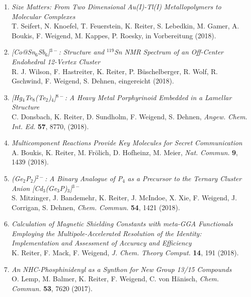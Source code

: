 \begin{enumerate}

\item \textit{Size Matters: From Two Dimensional Au(I)-Tl(I) Metallopolymers to Molecular Complexes}\\
T. Seifert, N. Knoefel, T. Feuerstein, K. Reiter, S. Lebedkin, M. Gamer, A. Boukis, F. Weigend, M. Kappes, P. Roesky, in Vorbereitung (2018).

\item \textit{[Co@Sn$_6$Sb$_6$]$^{3-}$: Structure and $^{119}$Sn NMR Spectrum of an Off-Center Endohedral 12-Vertex Cluster}\\
R. J. Wilson, F. Hastreiter, K. Reiter, P. Büschelberger, R. Wolf, R. Gschwind, F. Weigend, S. Dehnen, eingereicht (2018).

\item \textit{[Hg$_4$Te$_8$(Te$_2$)$_4$]$^{8-}$: A Heavy Metal Porphyrinoid Embedded in a Lamellar Structure}\\
C. Donsbach, K. Reiter, D. Sundholm, F. Weigend, S. Dehnen, \textit{Angew. Chem. Int. Ed.} \textbf{57}, 8770, (2018).

\item \textit{Multicomponent Reactions Provide Key Molecules for Secret Communication}\\ 
A. Boukis, K. Reiter, M. Frölich, D. Hofheinz, M. Meier, \textit{Nat. Commun.} \textbf{9}, 1439 (2018).

\item \textit{(Ge$_2$P$_2$)$^{2-}$: A Binary Analogue of P$_4$ as a Precursor to the Ternary Cluster Anion [Cd$_3$(Ge$_3$P)$_3$]$^{3-}$}\\
S. Mitzinger, J. Bandemehr, K. Reiter, J. McIndoe, X. Xie, F. Weigend, J. Corrigan, S. Dehnen, \textit{Chem. Commun.} \textbf{54}, 1421 (2018).

\item \textit{Calculation of Magnetic Shielding Constants with meta-GGA Functionals Employing the Multipole-Accelerated Resolution of the Identity: Implementation and Assessment of Accuracy and Efficiency}\\ 
K. Reiter, F. Mack, F. Weigend, \textit{J. Chem. Theory Comput.} \textbf{14}, 191 (2018).

\item \textit{An NHC-Phosphinidenyl as a Synthon for New Group 13/15 Compounds}\\
O. Lemp, M. Balmer, K. Reiter, F. Weigend, C. von Hänisch, \textit{Chem. Commun.} \textbf{53}, 7620 (2017).


\end{enumerate}
